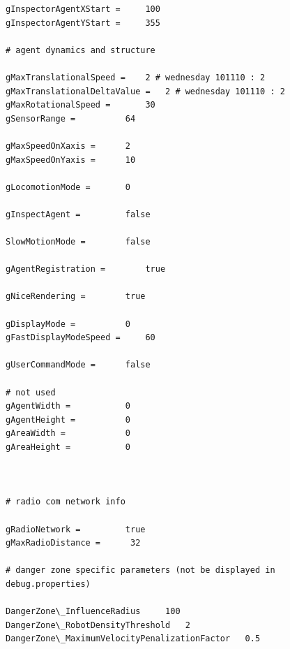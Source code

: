 \documentclass[a4paper]{book}
\begin{document}
\begin{appendices}
\begin{lstlisting}
gInspectorAgentXStart =		100
gInspectorAgentYStart =		355

# agent dynamics and structure

gMaxTranslationalSpeed = 	2 # wednesday 101110 : 2  
gMaxTranslationalDeltaValue = 	2 # wednesday 101110 : 2 	
gMaxRotationalSpeed = 		30 
gSensorRange = 			64 

gMaxSpeedOnXaxis = 		2
gMaxSpeedOnYaxis = 		10

gLocomotionMode = 		0

gInspectAgent = 		false

SlowMotionMode =		false

gAgentRegistration = 		true

gNiceRendering = 		true

gDisplayMode =			0
gFastDisplayModeSpeed = 	60

gUserCommandMode = 		false

# not used
gAgentWidth =			0
gAgentHeight =			0
gAreaWidth = 			0
gAreaHeight = 			0



# radio com network info

gRadioNetwork = 		true
gMaxRadioDistance = 	 32 

# danger zone specific parameters (not be displayed in debug.properties)

DangerZone\_InfluenceRadius 	100
DangerZone\_RobotDensityThreshold	2
DangerZone\_MaximumVelocityPenalizationFactor	0.5

\end{lstlisting}

\end{appendices}

\end{document}

